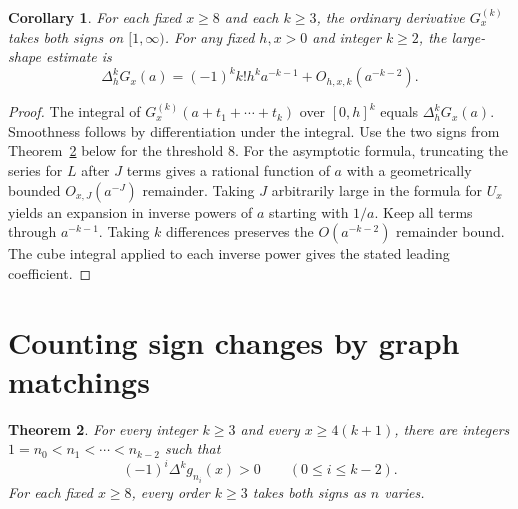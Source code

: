 \documentclass[11pt,a4paper]{article}
\newtheorem{theorem}{Theorem}[section]
\newtheorem{corollary}[theorem]{Corollary}
\begin{document}
\begin{corollary}
For each fixed $x\ge8$ and each $k\ge3$, the ordinary derivative
$G_x^{(k)}$ takes both signs on $[1,\infty)$.
For any fixed $h,x>0$ and integer $k\ge2$, the large-shape estimate is
\[
 \Delta_h^k G_x(a)=(-1)^k k!h^k a^{-k-1}+O_{h,x,k}(a^{-k-2}).
\]
\end{corollary}
\begin{proof}
The integral of $G_x^{(k)}(a+t_1+\cdots+t_k)$ over $[0,h]^k$ equals
$\Delta_h^kG_x(a)$. Smoothness follows by differentiation under the integral. Use the two signs from Theorem~\ref{thm:matching} below for the threshold $8$.
For the asymptotic formula, truncating the series for $L$ after $J$ terms
gives a rational function of $a$ with a geometrically bounded
$O_{x,J}(a^{-J})$ remainder. Taking $J$ arbitrarily large in the formula for
$U_x$ yields an expansion in inverse powers of $a$ starting with $1/a$.
Keep all terms through $a^{-k-1}$. Taking $k$ differences preserves the
$O(a^{-k-2})$ remainder bound. The cube integral applied to each inverse
power gives the stated leading coefficient.
\end{proof}

\section{Counting sign changes by graph matchings}

\begin{theorem}\label{thm:matching}
For every integer $k\ge3$ and every $x\ge4(k+1)$, there are integers
$1=n_0<n_1<\cdots<n_{k-2}$ such that
\[
  (-1)^i\Delta^k g_{n_i}(x)>0\qquad(0\le i\le k-2).
\]
For each fixed $x\ge8$, every order $k\ge3$ takes both signs as $n$ varies.
\end{theorem}
\end{document}
